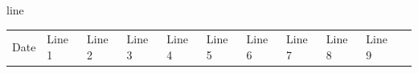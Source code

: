 \documentclass[
]{article}
\newcounter{none} %
\begin{document}
line

{\def\LTcaptype{none} %
\begin{longtable}[]{@{}
  >{\raggedright\arraybackslash}p{}
  >{\raggedright\arraybackslash}p{}
  >{\raggedright\arraybackslash}p{}
  >{\raggedright\arraybackslash}p{}
  >{\raggedright\arraybackslash}p{}
  >{\raggedright\arraybackslash}p{}
  >{\raggedright\arraybackslash}p{}
  >{\raggedright\arraybackslash}p{}
  >{\raggedright\arraybackslash}p{}
  >{\raggedright\arraybackslash}p{}
  >{\raggedright\arraybackslash}p{}@{}}
\toprule\noalign{}
\begin{minipage}[b]{\linewidth}\raggedright
Date
\end{minipage} & \begin{minipage}[b]{\linewidth}\raggedright
Line 1
\end{minipage} & \begin{minipage}[b]{\linewidth}\raggedright
Line 2
\end{minipage} & \begin{minipage}[b]{\linewidth}\raggedright
Line 3
\end{minipage} & \begin{minipage}[b]{\linewidth}\raggedright
Line 4
\end{minipage} & \begin{minipage}[b]{\linewidth}\raggedright
Line 5
\end{minipage} & \begin{minipage}[b]{\linewidth}\raggedright
Line 6
\end{minipage} & \begin{minipage}[b]{\linewidth}\raggedright
Line 7
\end{minipage} & \begin{minipage}[b]{\linewidth}\raggedright
Line 8
\end{minipage} & \begin{minipage}[b]{\linewidth}\raggedright
Line 9
\end{minipage} & \begin{minipage}[b]{\linewidth}\raggedright

\end{minipage}
\end{longtable}}
\end{document}
